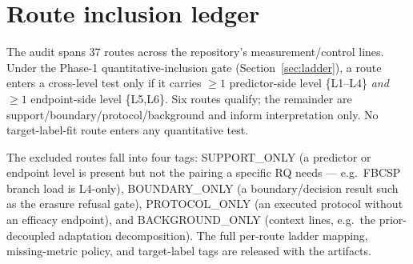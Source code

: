 \section{Route inclusion ledger}
\label{app:routes}

The audit spans 37 routes across the repository's measurement/control lines. Under the Phase-1
quantitative-inclusion gate (Section~\ref{sec:ladder}), a route enters a cross-level test only if it
carries $\geq 1$ predictor-side level \{L1--L4\} \emph{and} $\geq 1$ endpoint-side level \{L5,L6\}. Six
routes qualify; the remainder are support/boundary/protocol/background and inform interpretation only.
No target-label-fit route enters any quantitative test.

\begin{table}[h]
\centering\small

\caption{Route inclusion. Only routes with a predictor$+$endpoint pairing enter quantitative tests; no
target-label-fit route does.}
\label{tab:routes}
\end{table}

The excluded routes fall into four tags: \textsf{SUPPORT\_ONLY} (a predictor or endpoint level is
present but not the pairing a specific RQ needs --- e.g.\ FBCSP branch load is L4-only), \textsf{BOUNDARY\_ONLY}
(a boundary/decision result such as the erasure refusal gate), \textsf{PROTOCOL\_ONLY} (an executed
protocol without an efficacy endpoint), and \textsf{BACKGROUND\_ONLY} (context lines, e.g.\ the
prior-decoupled adaptation decomposition). The full per-route ladder mapping, missing-metric policy,
and target-label tags are released with the artifacts.
